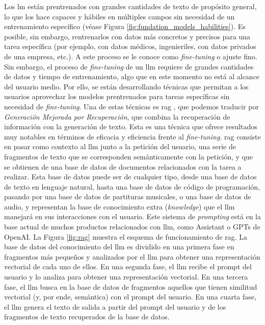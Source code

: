 Los \gls{lm} están prentrenados con grandes cantidades de texto de propósito general, lo que los hace capaces y hábiles en múltiples campos sin necesidad de un entrenamiento específico (véase Figura \ref{fig:fundation_models_habilities}). Es posible, sin embargo, rentrenarlos con datos más concretos y precisos para una tarea específica (por ejemplo, con datos médicos, ingenieriles, con datos privados de una empresa, etc.). A este proceso se le conoce como \emph{fine-tuning} o ajuste fino. Sin embargo, el proceso de \emph{fine-tuning} de un \gls{llm} requiere de grandes cantidades de datos y tiempo de entrenamiento, algo que en este momento no está al alcance del usuario medio. Por ello, se están desarrollando técnicas que permitan a los usuarios aprovechar los modelos prentrenados para tareas específicas sin necesidad de \emph{fine-tuning}. Una de estas técnicas es \gls{rag} \citep{WhatRetrievalaugmentedGeneration2021}, que podemos traducir por \emph{Generación Mejorada por Recuperación}, que combina la recuperación de información con la generación de texto. Esta es una técnica que ofrece resultados muy notables en términos de eficacia y eficiencia frente al \emph{fine-tuning}. \gls{rag} consiste en pasar como contexto al \gls{llm} junto a la petición del usuario, una serie de fragmentos de texto que se corresponden semánticamente con la petición, y que se obtienen de una base de datos de documentos relacionados con la tarea a realizar. Esta base de datos puede ser de cualquier tipo, desde una base de datos de texto en lenguaje natural, hasta una base de datos de código de programación, pasando por una base de datos de partituras musicales, o una base de datos de audio, y representan la base de conocimiento extra (\emph{knowledge}) que el \gls{llm} manejará en sus interacciones con el usuario. Este sistema de \emph{prompting} está en la base actual de muchos productos relacionados con \gls{llm}, como Assistant o GPTs de OpenAI. La Figura \ref{fig:rag} muestra el esquema de funcionamiento de \gls{rag}. La base de datos del conocimiento del \gls{llm} es dividido en una primera fase en fragmentos más pequeños y analizados por el \gls{llm} para obtener una representación vectorial de cada uno de ellos. En una segunda fase, el \gls{llm} recibe el {prompt} del usuario y lo analiza para obtener una representación vectorial. En una tercera fase, el \gls{llm} busca en la base de datos de fragmentos aquellos que tienen similitud vectorial (y, por ende, semántica) con el {prompt} del usuario. En una cuarta fase, el \gls{llm} genera el texto de salida a partir del {prompt} del usuario y de los fragmentos de texto recuperados de la base de datos. 

